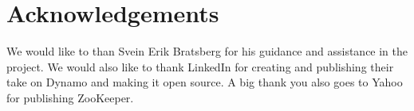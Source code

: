 
\section*{Acknowledgements}
We would like to than Svein Erik Bratsberg for his guidance and assistance in the project.
We would also like to thank LinkedIn for creating and publishing their take on Dynamo and making it open source.
A big thank you also goes to Yahoo for publishing ZooKeeper.
